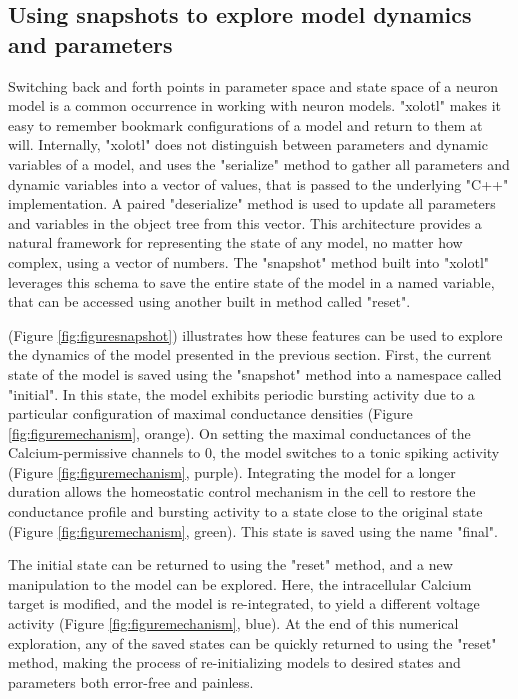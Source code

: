 \documentclass{frontiersSCNS} %
\begin{document}
%
%
%
%
%



\subsection{Using snapshots to explore model dynamics and parameters}

Switching back and forth points in parameter space and state space of a neuron model is a common occurrence in working with neuron models. "xolotl" makes it easy to remember bookmark configurations of a model and return to them at will. Internally, "xolotl" does not distinguish between parameters and dynamic variables of a model, and uses the "serialize" method to gather all parameters and dynamic variables into a vector of values, that is passed to the underlying "C++" implementation. A paired "deserialize" method is used to update all parameters and variables in the object tree from this vector. This architecture provides a natural framework for representing the state of any model, no matter how complex, using a vector of numbers. The "snapshot" method built into "xolotl" leverages this schema to save the entire state of the model in a named variable, that can be accessed using another built in method called "reset". 

(Figure \ref{fig:figuresnapshot}) illustrates how these features can be used to explore the dynamics of the model presented in the previous section. First, the current state of the model is saved using the "snapshot" method into a namespace called "initial". In this state, the model exhibits periodic bursting activity due to a particular configuration of maximal conductance densities (Figure \ref{fig:figuremechanism}, orange).  On setting the maximal conductances of the Calcium-permissive channels to 0, the model switches to a tonic spiking activity (Figure \ref{fig:figuremechanism}, purple). Integrating the model for a longer duration allows the homeostatic control mechanism in the cell to restore the conductance profile and bursting activity to a state close to the original state (Figure \ref{fig:figuremechanism}, green). This state is saved using the name "final".

The initial state can be returned to using the "reset" method, and a new manipulation to the model can be explored. Here, the intracellular Calcium target is modified, and the model is re-integrated, to yield a different voltage activity (Figure \ref{fig:figuremechanism}, blue). At the end of this numerical exploration, any of the saved states can be quickly returned to using the "reset" method, making the process of re-initializing models to desired states and parameters both error-free and painless. 
\end{document}
